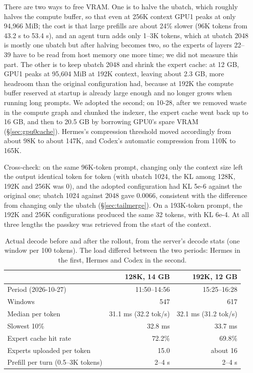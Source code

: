 \documentclass[11pt,a4paper]{article}
\newcommand{\tps}{tok/s}
\begin{document}
There are two ways to free VRAM. One is to halve the ubatch, which roughly halves the compute buffer, so that even at 256K context GPU1 peaks at only 94,966 MiB; the cost is that large prefills are about 24\% slower (96K tokens from 43.2 s to 53.4 s), and an agent turn adds only 1--3K tokens, which at ubatch 2048 is mostly one ubatch but after halving becomes two, so the experts of layers 22--39 have to be read from host memory one more time; we did not measure this part. The other is to keep ubatch 2048 and shrink the expert cache: at 12 GB, GPU1 peaks at 95,604 MiB at 192K context, leaving about 2.3 GB, more headroom than the original configuration had, because at 192K the compute buffer reserved at startup is already large enough and no longer grows when running long prompts. We adopted the second; on 10-28, after we removed waste in the compute graph and chunked the indexer, the expert cache went back up to 16 GB, and then to 20.5 GB by borrowing GPU0's spare VRAM (\S\ref{sec:gpu0cache}). Hermes's compression threshold moved accordingly from about 98K to about 147K, and Codex's automatic compression from 110K to 165K.

Cross-check: on the same 96K-token prompt, changing only the context size left the output identical token for token (with ubatch 1024, the KL among 128K, 192K and 256K was 0), and the adopted configuration had KL 5e-6 against the original one; ubatch 1024 against 2048 gave 0.0066, consistent with the difference from changing only the ubatch (\S\ref{sec:tailmerge}). On a 193K-token prompt, the 192K and 256K configurations produced the same 32 tokens, with KL 6e-4. At all three lengths the passkey was retrieved from the start of the context.

\begin{table}[h]
  \centering
  \small
  \caption{Actual decode before and after the rollout, from the server's decode stats (one window per 100 tokens). The load differed between the two periods: Hermes in the first, Hermes and Codex in the second.}
  \label{tab:ctxdecode}
  \begin{tabular}{@{}l r r@{}}
    \toprule
     & 128K, 14 GB & 192K, 12 GB \\
    \midrule
    Period (2026-10-27) & 11:50--14:56 & 15:25--16:28 \\
    Windows & 547 & 617 \\
    Median per token & 31.1 ms (32.2 \tps{}) & 32.1 ms (31.2 \tps{}) \\
    Slowest 10\% & 32.8 ms & 33.7 ms \\
    Expert cache hit rate & 72.2\% & 69.8\% \\
    Experts uploaded per token & 15.0 & about 16 \\
    Prefill per turn (0.5--3K tokens) & 2--4 s & 2--4 s \\
    \bottomrule
  \end{tabular}
\end{table}
\end{document}
